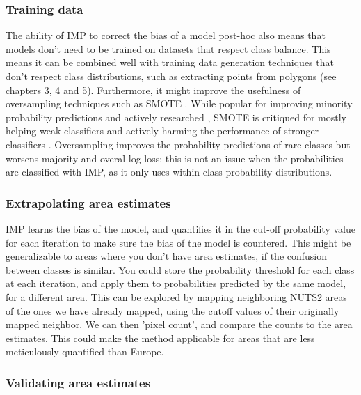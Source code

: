         \subsubsection{Training data}
        
        The ability of IMP to correct the bias of a model post-hoc also means that models don't need to be trained on datasets that respect class balance. This means it can be combined well with training data generation techniques that don't respect class distributions, such as extracting points from polygons (see chapters 3, 4 and 5). Furthermore, it might improve the usefulness of oversampling techniques such as SMOTE  \citep{chawla2002smote}. While popular for improving minority probability predictions \citep{elor2022smote} and actively researched \citep{douzas2019imbalanced}, SMOTE is critiqued for mostly helping weak classifiers and actively harming the performance of stronger classifiers \citep{elor2022smote}. Oversampling improves the probability predictions of rare classes but worsens majority and overal log loss; this is not an issue when the probabilities are classified with IMP, as it only uses within-class probability distributions.

        \subsubsection{Extrapolating area estimates}
        
        IMP learns the bias of the model, and quantifies it in the cut-off probability value for each iteration to make sure the bias of the model is countered. This might be generalizable to areas where you don't have area estimates, if the confusion between classes is similar.
        You could store the probability threshold for each class at each iteration, and apply them to probabilities predicted by the same model, for a different area.
        This can be explored by mapping neighboring NUTS2 areas of the ones we have already mapped, using the cutoff values of their originally mapped neighbor. We can then 'pixel count', and compare the counts to the area estimates.
        This could make the method applicable for areas that are less meticulously quantified than Europe.
        
        \subsubsection{Validating area estimates}
        
